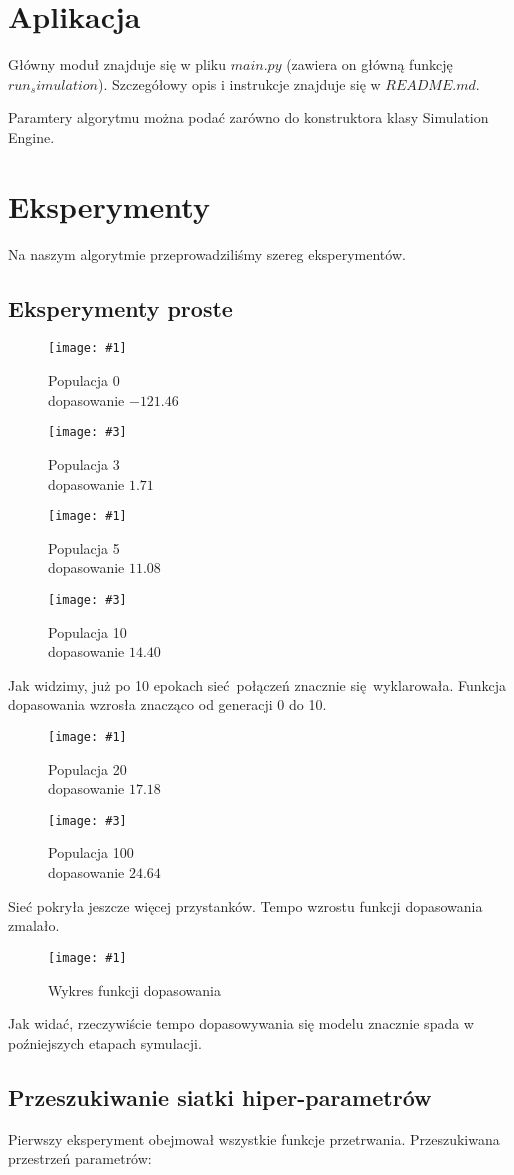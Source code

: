 \documentclass[12pt,a4paper]{article}
\newcommand{\imgcustomsize}[3]{
	\begin{figure}[H]
		\centering
		\texttt{[image: \#1]}
		\caption{#2}
	\end{figure}
}
\newcommand{\imgsidebyside}[4]{
	\begin{figure}[H]
		\centering
		\begin{minipage}{.45\textwidth}
			\centering
			\texttt{[image: \#1]}
			\caption{#2}
		\end{minipage}%
		\hfill
		\begin{minipage}{.45\textwidth}
			\centering
			\texttt{[image: \#3]}
			\caption{#4}
		\end{minipage}
	\end{figure}
}
\begin{document}
\section{Aplikacja}

Główny moduł znajduje się w pliku $main.py$ (zawiera on główną funkcję $run_simulation$). Szczegółowy opis i instrukcje znajduje się w $README.md$.

Paramtery algorytmu można podać zarówno do konstruktora klasy Simulation Engine.

\section{Eksperymenty}
Na naszym algorytmie przeprowadziliśmy szereg eksperymentów.

\subsection{Eksperymenty proste}
\imgsidebyside{test1/0}{Populacja 0\\ dopasowanie $-121.46$}{test1/3}{Populacja 3\\ dopasowanie $1.71$}
\imgsidebyside{test1/5}{Populacja 5\\ dopasowanie $11.08$}{test1/10}{Populacja 10\\ dopasowanie $14.40$}
Jak widzimy, już po 10 epokach sieć połączeń znacznie się wyklarowała. Funkcja dopasowania wzrosła znacząco od generacji 0 do 10.

\imgsidebyside{test1/20}{Populacja 20\\ dopasowanie $17.18$}{test1/100}{Populacja 100\\ dopasowanie $24.64$}
Sieć pokryła jeszcze więcej przystanków. Tempo wzrostu funkcji dopasowania zmalało.

\imgcustomsize{test1/plot}{Wykres funkcji dopasowania}{0.6}
Jak widać, rzeczywiście tempo dopasowywania się modelu znacznie spada w poźniejszych etapach symulacji.

\subsection{Przeszukiwanie siatki hiper-parametrów}

Pierwszy eksperyment obejmował wszystkie funkcje przetrwania. Przeszukiwana przestrzeń parametrów:

\end{document}
